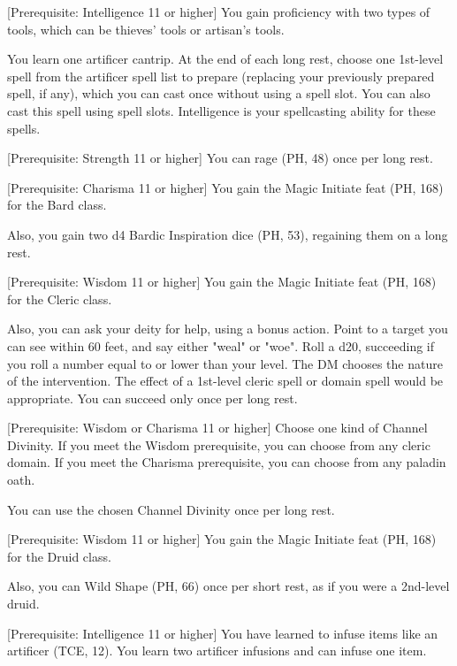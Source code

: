 \documentclass[letterpaper,twocolumn,openany,nodeprecatedcode,bg=print]{dndbook}
\begin{document}
[Prerequisite: Intelligence 11 or higher]
\label{artificer-initiate}
You gain proficiency with two types of tools, which can be thieves' tools or artisan's tools.

You learn one artificer cantrip. 
At the end of each long rest, choose one 1st-level spell from the artificer spell list to prepare (replacing your previously prepared spell, if any), which you can cast once without using a spell slot. 
You can also cast this spell using spell slots. 
Intelligence is your spellcasting ability for these spells.

[Prerequisite: Strength 11 or higher]
\label{barbarian-initiate}
You can rage (PH, 48) once per long rest.

[Prerequisite: Charisma 11 or higher]
\label{bard-initiate}
You gain the Magic Initiate feat (PH, 168) for the Bard class.

Also, you gain two d4 Bardic Inspiration dice (PH, 53), regaining them on a long rest.

[Prerequisite: Wisdom 11 or higher]
\label{cleric-initiate}
You gain the Magic Initiate feat (PH, 168) for the Cleric class.

Also, you can ask your deity for help, using a bonus action. 
Point to a target you can see within 60 feet, and say either "weal" or "woe". 
Roll a d20, succeeding if you roll a number equal to or lower than your level.
The DM chooses the nature of the intervention.
The effect of a 1st-level cleric spell or domain spell would be appropriate. 
You can succeed only once per long rest.

[Prerequisite: Wisdom or Charisma 11 or higher]
\label{divine-initiate}
Choose one kind of Channel Divinity. 
If you meet the Wisdom prerequisite, you can choose from any cleric domain. 
If you meet the Charisma prerequisite, you can choose from any paladin oath. 

You can use the chosen Channel Divinity once per long rest.

[Prerequisite: Wisdom 11 or higher]
\label{druid-initiate}
You gain the Magic Initiate feat (PH, 168) for the Druid class.

Also, you can Wild Shape (PH, 66) once per short rest, as if you were a 2nd-level druid.

[Prerequisite: Intelligence 11 or higher]
\label{infuser-initiate}
You have learned to infuse items like an artificer (TCE, 12). 
You learn two artificer infusions and can infuse one item.
\end{document}
